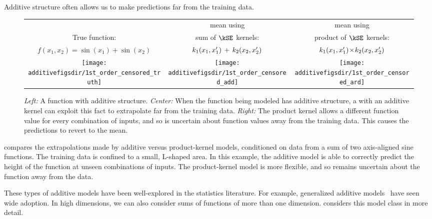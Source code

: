 Additive structure often allows us to make predictions far from the training data.
%
\begin{figure}
\centering
\begin{tabular}{ccc}
 & \gp{} mean using & \gp{} mean using \\
True function: & sum of $\kSE$ kernels: & product of $\kSE$ kernels: \\
\parbox{0.33\columnwidth}{$f(x_1, x_2) = \sin(x_1) + \sin(x_2)$} & $k_1(x_1, x_1') \, + \, k_2(x_2, x_2')$ &  $k_1(x_1, x_1') \! \times \! k_2(x_2, x_2')$ \\[0.2em]
\hspace{-0.1in}\texttt{[image: \\additivefigsdir/1st\_order\_censored\_truth]} &
\hspace{-0.1in}\texttt{[image: \\additivefigsdir/1st\_order\_censored\_add]} & 
\hspace{-0.1in}\texttt{[image: \\additivefigsdir/1st\_order\_censored\_ard]}\\[1em]
\end{tabular}
\caption[Long-range inference in functions with additive structure]
{\emph{Left:} A function with additive structure.
\emph{Center:} When the function being modeled has additive structure, a \gp{} with an additive kernel can exploit this fact to extrapolate far from the training data.
\emph{Right:} The product kernel allows a different function value for every combination of inputs, and so is uncertain about function values away from the training data.  This causes the predictions to revert to the mean.
}
\label{fig:synth2d}
\end{figure}
%
 compares the extrapolations made by additive versus product-kernel \gp{} models, conditioned on data from a sum of two axis-aligned sine functions.
The training data is confined to a small, L-shaped area.
In this example, the additive model is able to correctly predict the height of the function at unseen combinations of inputs.
The product-kernel model is more flexible, and so remains uncertain about the function away from the data.

These types of additive models have been well-explored in the statistics literature.
For example, generalized additive models~\citep{hastie1990generalized} have seen wide adoption.
In high dimensions, we can also consider sums of functions of more than one dimension.
 considers this model class in more detail.




